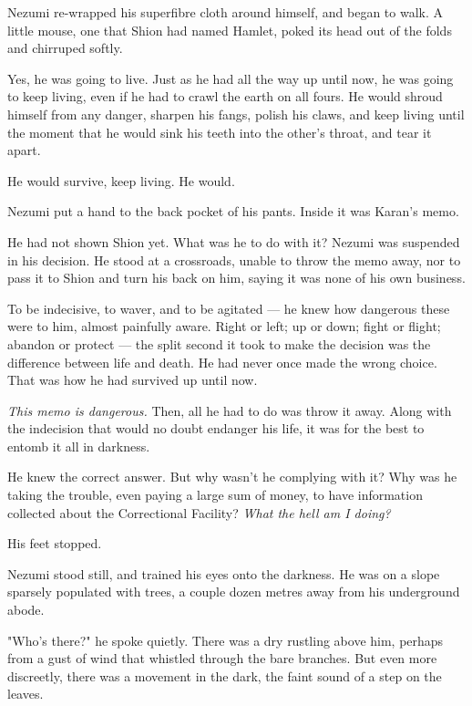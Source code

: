 Nezumi re-wrapped his superfibre cloth around himself, and began to
walk. A little mouse, one that Shion had named Hamlet, poked its head
out of the folds and chirruped softly.

Yes, he was going to live. Just as he had all the way up until now, he
was going to keep living, even if he had to crawl the earth on all
fours. He would shroud himself from any danger, sharpen his fangs,
polish his claws, and keep living until the moment that he would sink
his teeth into the other's throat, and tear it apart.

He would survive, keep living. He would.

Nezumi put a hand to the back pocket of his pants. Inside it was Karan's
memo.


He had not shown Shion yet. What was he to do with it? Nezumi was
suspended in his decision. He stood at a crossroads, unable to throw the
memo away, nor to pass it to Shion and turn his back on him, saying it
was none of his own business.

To be indecisive, to waver, and to be agitated --- he knew how dangerous
these were to him, almost painfully aware. Right or left; up or down;
fight or flight; abandon or protect --- the split second it took to make
the decision was the difference between life and death. He had never
once made the wrong choice. That was how he had survived up until now.

\emph{This memo is dangerous.} Then, all he had to do was throw it away. Along
with the indecision that would no doubt endanger his life, it was for
the best to entomb it all in darkness.

He knew the correct answer. But why wasn't he complying with it? Why was
he taking the trouble, even paying a large sum of money, to have
information collected about the Correctional Facility? \emph{What the hell am
I doing?}

His feet stopped.

Nezumi stood still, and trained his eyes onto the darkness. He was on a
slope sparsely populated with trees, a couple dozen metres away from his
underground abode.

"Who's there?" he spoke quietly. There was a dry rustling above him,
perhaps from a gust of wind that whistled through the bare branches. But
even more discreetly, there was a movement in the dark, the faint sound
of a step on the leaves.

